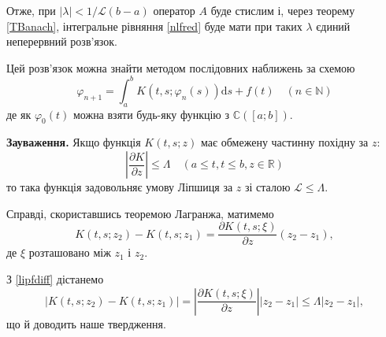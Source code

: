 \documentclass[14pt,twoside]{extreport}
\theoremstyle{mystyle}
\numberwithin{equation}{chapter}
\newcommand{\cab}{\mathbb{C}([a; b])}
\begin{document}
Отже, при $|\lambda| < 1/\mathscr{L}(b-a)$ оператор $A$ буде стислим і, через теорему \ref{TBanach}, інтегральне рівняння \eqref{nlfred} буде мати при таких $\lambda$ єдиний неперервний розв'язок.

Цей розв'язок можна знайти методом послідовних наближень за схемою
\[
 \varphi_{n+1} = \int_{a}^{b} K(t, s; \varphi_n(s)) \mathrm{d}s + f(t) \quad (n\in\mathbb{N})
\]
де як $\varphi_0(t)$ можна взяти будь-яку функцію з $\cab$.

\textbf{Зауваження.} Якщо функція $K(t, s; z)$ має обмежену частинну похідну за $z$:
\[
 \left|\dfrac{\partial K}{\partial z}\right| \leqslant \Lambda \quad (a\leqslant t, t \leqslant b, z\in \mathbb{R})
\]
то така функція задовольняє умову Ліпшиця за $z$ зі сталою $\mathscr{L} \leqslant \Lambda$.

Справді, скориставшись теоремою Лагранжа, матимемо
\begin{equation}\label{lipfdiff}
 K(t, s; z_2) - K(t, s; z_1) = \dfrac{\partial K(t, s; \xi)}{\partial z} (z_2 - z_1),
\end{equation}
де $\xi$ розташовано між $z_1$ і $z_2$.

З \eqref{lipfdiff} дістанемо
\[
 |K(t, s; z_2) - K(t, s; z_1)| = \left|\dfrac{\partial K(t, s; \xi)}{\partial z}\right| |z_2 - z_1| \leqslant \Lambda |z_2 - z_1|,
\]
що й доводить наше твердження.
\end{document}
